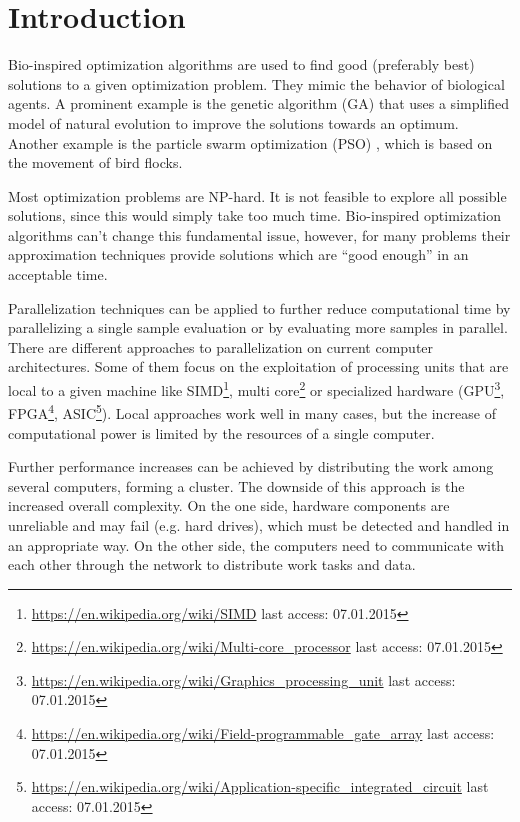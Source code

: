 \chapter{Introduction}
Bio-inspired optimization algorithms are used to find good (preferably best) solutions to a given optimization problem. They mimic the behavior of biological agents. A prominent example is the genetic algorithm (GA) \cite{sivanandam2008genetic} that uses a simplified model of natural evolution to improve the solutions towards an optimum. Another example is the particle swarm optimization (PSO) \cite{kennedy2010particle}, which is based on the movement of bird flocks.

Most optimization problems are NP-hard. It is not feasible to explore all possible solutions, since this would simply take too much time. Bio-inspired optimization algorithms can't change this fundamental issue, however, for many problems their approximation techniques provide solutions which are ``good enough'' in an acceptable time.

Parallelization techniques can be applied to further reduce computational time by parallelizing a single sample evaluation or by evaluating more samples in parallel. There are different approaches to parallelization on current computer architectures. Some of them focus on the exploitation of processing units that are local to a given machine like SIMD\footnote{\url{https://en.wikipedia.org/wiki/SIMD} last access: 07.01.2015}, multi core\footnote{\url{https://en.wikipedia.org/wiki/Multi-core_processor} last access: 07.01.2015} or specialized hardware (GPU\footnote{\url{https://en.wikipedia.org/wiki/Graphics_processing_unit} last access: 07.01.2015}, FPGA\footnote{\url{https://en.wikipedia.org/wiki/Field-programmable_gate_array} last access: 07.01.2015}, ASIC\footnote{\url{https://en.wikipedia.org/wiki/Application-specific_integrated_circuit} last access: 07.01.2015}). Local approaches work well in many cases, but the increase of computational power is limited by the resources of a single computer.

Further performance increases can be achieved by distributing the work among several computers, forming a cluster. The downside of this approach is the increased overall complexity. On the one side, hardware components are unreliable and may fail (e.g. hard drives), which must be detected and handled in an appropriate way. On the other side, the computers need to communicate with each other through the network to distribute work tasks and data.

